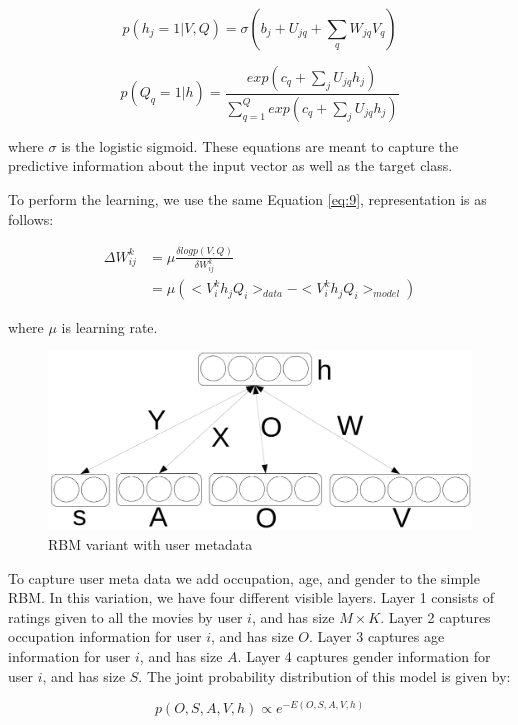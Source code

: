 \documentclass[conference]{IEEEtran}
\begin{document}
    \begin{equation}
      p(h_j=1|V,Q) = \sigma(b_j+U_{jq}+\sum_qW_{jq}V_q)
      \label{eq:13}
    \end{equation}

    \begin{equation}
      p(Q_q=1|h) = \frac{exp(c_q+\sum_{j}U_{jq}h_j)}{\sum_{q=1}^{Q}exp(c_q+\sum_{j}U_{jq}h_j)}
      \label{eq:14}
    \end{equation}

    where $\sigma$ is the logistic sigmoid. These equations are meant to capture the predictive information about the input vector as well as the target class.

    To perform the learning, we use the same Equation \ref{eq:9}, representation is as follows:

    \begin{align}
      \Delta W_{ij}^k & = \mu \frac{\delta logp(V,Q)}{\delta W_{ij}^k} \nonumber \\ 
                      & = \mu (<V_i^kh_jQ_i>_{data}-<V_i^kh_jQ_i>_{model})
                      \label{eq:15}
    \end{align}

    where $\mu$ is learning rate.

    \begin{figure}
      \centering
      \includegraphics[width=0.5\linewidth]{rbm2}
      \caption{RBM variant with user metadata}
      \label{fig:5}
    \end{figure}

    To capture user meta data we add occupation, age, and gender to the simple RBM. In this variation, we have four different visible layers. Layer 1 consists of ratings given to all the movies by user $i$, and has size $M \times K$. Layer 2 captures occupation information for user $i$, and has size $O$. Layer 3 captures age information for user $i$, and has size $A$. Layer 4 captures gender information for user $i$, and has size $S$. The joint probability distribution of this model is given by:

    \begin{equation}
      p(O,S,A,V,h) \propto e^{-E(O,S,A,V,h)}
      \label{eq:16}
    \end{equation}
\end{document}
